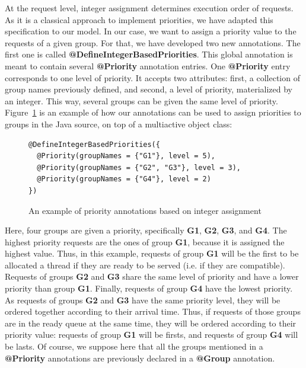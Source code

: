 \documentclass[11pt]{report}
\begin{document}
At the request level, integer assignment determines execution order of requests. As it is a classical approach to implement priorities, we have adapted this specification to our model. In our case, we want to assign a priority value to the requests of a given group. For that, we have developed two new annotations. The first one is called \textbf{@DefineIntegerBasedPriorities}. This global annotation is meant to contain several \textbf{@Priority} annotation entries. One \textbf{@Priority} entry corresponds to one level of priority. It accepts two attributes: first, a collection of group names previously defined, and second, a level of priority, materialized by an integer. This way, several groups can be given the same level of priority. Figure~\ref{integer_priority_annotation} is an example of how our annotations can be used to assign priorities to groups in the Java source, on top of a multiactive object class:

\begin{figure}[!ht]
	\lstset{language=java, numbers=left, numberstyle=\tiny, stepnumber=1, numbersep=5pt, basicstyle=\footnotesize}
	\begin{lstlisting}[frame=single]
@DefineIntegerBasedPriorities({
  @Priority(groupNames = {"G1"}, level = 5),
  @Priority(groupNames = {"G2", "G3"}, level = 3),
  @Priority(groupNames = {"G4"}, level = 2)
})
 	\end{lstlisting}
\caption{An example of priority annotations based on integer assignment}
\label{integer_priority_annotation}
\end{figure}

Here, four groups are given a priority, specifically \textbf{G1}, \textbf{G2}, \textbf{G3}, and \textbf{G4}. The highest priority requests are the ones of group \textbf{G1}, because it is assigned the highest value. Thus, in this example, requests of group \textbf{G1} will be the first to be allocated a thread if they are ready to be served (i.e. if they are compatible). Requests of groups \textbf{G2} and \textbf{G3} share the same level of priority and have a lower priority than group \textbf{G1}. Finally, requests of group \textbf{G4} have the lowest priority. As requests of groups \textbf{G2} and \textbf{G3} have the same priority level, they will be ordered together according to their arrival time. Thus, if requests of those groups are in the ready queue at the same time, they will be ordered according to their priority value: requests of group \textbf{G1} will be firsts, and requests of group \textbf{G4} will be lasts.
Of course, we suppose here that all the groups mentioned in a \textbf{@Priority} annotations are previously declared in a \textbf{@Group} annotation. 
\end{document}
